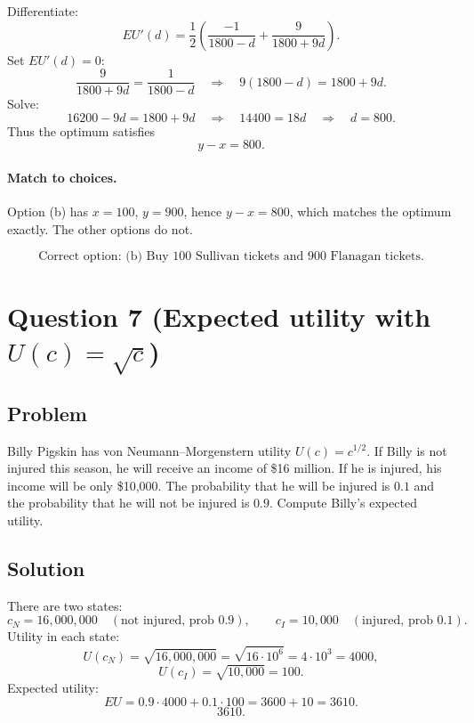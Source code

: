 \documentclass[12pt]{article}
\begin{document}
Differentiate:
\[
EU'(d)=\frac12\left(\frac{-1}{1800-d}+\frac{9}{1800+9d}\right).
\]
Set \(EU'(d)=0\):
\[
\frac{9}{1800+9d}=\frac{1}{1800-d}
\quad\Longrightarrow\quad
9(1800-d)=1800+9d.
\]
Solve:
\[
16200-9d = 1800+9d
\quad\Longrightarrow\quad
14400=18d
\quad\Longrightarrow\quad
d=800.
\]
Thus the optimum satisfies
\[
y-x=800.
\]

\paragraph{Match to choices.}
Option (b) has \(x=100\), \(y=900\), hence \(y-x=800\), which matches the optimum exactly. The other options do not.

\[
\boxed{\text{Correct option: (b) Buy 100 Sullivan tickets and 900 Flanagan tickets.}}
\]

\newpage
\section*{Question 7 (Expected utility with \(U(c)=\sqrt{c}\))}
\subsection*{Problem}
Billy Pigskin has von Neumann--Morgenstern utility \(U(c)=c^{1/2}\).
If Billy is not injured this season, he will receive an income of \$16 million.
If he is injured, his income will be only \$10{,}000.
The probability that he will be injured is \(0.1\) and the probability that he will not be injured is \(0.9\).
Compute Billy's expected utility.

\subsection*{Solution}
There are two states:
\[
c_N=16{,}000{,}000 \quad (\text{not injured, prob }0.9), 
\qquad
c_I=10{,}000 \quad (\text{injured, prob }0.1).
\]
Utility in each state:
\[
U(c_N)=\sqrt{16{,}000{,}000}
=\sqrt{16\cdot 10^6}
=4\cdot 10^3
=4000,
\]
\[
U(c_I)=\sqrt{10{,}000}=100.
\]
Expected utility:
\[
EU = 0.9\cdot 4000 + 0.1\cdot 100
=3600+10
=3610.
\]
\[
\boxed{3610.}
\]
\end{document}
